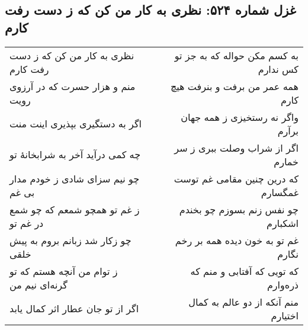\begin{center}
\section*{غزل شماره ۵۲۴: نظری به کار من کن که ز دست رفت کارم}
\label{sec:524}
\begin{longtable}{l p{0.5cm} r}
نظری به کار من کن که ز دست رفت کارم
&&
به کسم مکن حواله که به جز تو کس ندارم
\\
منم و هزار حسرت که در آرزوی رویت
&&
همه عمر من برفت و بنرفت هیچ کارم
\\
اگر به دستگیری بپذیری اینت منت
&&
واگر نه رستخیزی ز همه جهان برآرم
\\
چه کمی درآید آخر به شرابخانهٔ تو
&&
اگر از شراب وصلت ببری ز سر خمارم
\\
چو نیم سزای شادی ز خودم مدار بی غم
&&
که درین چنین مقامی غم توست غمگسارم
\\
ز غم تو همچو شمعم که چو شمع در غم تو
&&
چو نفس زنم بسوزم چو بخندم اشکبارم
\\
چو زکار شد زبانم بروم به پیش خلقی
&&
غم تو به خون دیده همه بر رخم نگارم
\\
ز توام من آنچه هستم که تو گرنه‌ای نیم من
&&
که تویی که آفتابی و منم که ذره‌وارم
\\
اگر از تو جان عطار اثر کمال یابد
&&
منم آنکه از دو عالم به کمال اختیارم
\\
\end{longtable}
\end{center}
